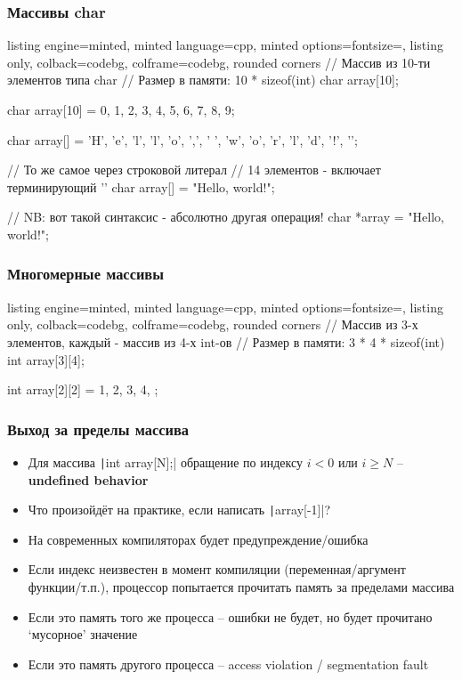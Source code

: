\documentclass[10pt]{beamer}
\begin{document}
\begin{frame}[fragile]
\frametitle{Массивы char}
\begin{tcblisting}{listing engine=minted, minted language=cpp, minted options={fontsize=\scriptsize}, listing only, colback=codebg, colframe=codebg, rounded corners}
// Массив из 10-ти элементов типа char
// Размер в памяти: 10 * sizeof(int)
char array[10];

char array[10] = {0, 1, 2, 3, 4, 5, 6, 7, 8, 9};

char array[] = {'H', 'e', 'l', 'l', 'o', ',',
  ' ', 'w', 'o', 'r', 'l', 'd', '!', '\0'};

// То же самое через строковой литерал
// 14 элементов - включает терминирующий '\0'
char array[] = "Hello, world!";

// NB: вот такой синтаксис - абсолютно другая операция!
char *array = "Hello, world!";
\end{tcblisting}
\end{frame}

\begin{frame}[fragile]
\frametitle{Многомерные массивы}
\begin{tcblisting}{listing engine=minted, minted language=cpp, minted options={fontsize=\scriptsize}, listing only, colback=codebg, colframe=codebg, rounded corners}
// Массив из 3-х элементов, каждый - массив из 4-х int-ов
// Размер в памяти: 3 * 4 * sizeof(int)
int array[3][4];

int array[2][2] = {
  {1, 2},
  {3, 4},
};
\end{tcblisting}
\end{frame}

\begin{frame}[fragile]
\frametitle{Выход за пределы массива}
\begin{itemize}
\item Для массива \texttt|int array[N];| обращение по индексу \(i<0\) или \(i\geq N\) -- \textbf{undefined behavior}
\pause
\item Что произойдёт на практике, если написать \texttt|array[-1]|?
\pause
\item На современных компиляторах будет предупреждение/ошибка
\pause
\item Если индекс неизвестен в момент компиляции (переменная/аргумент функции/т.п.), процессор попытается прочитать память за пределами массива
\pause
\item Если это память того же процесса -- ошибки не будет, но будет прочитано `мусорное' значение
\pause
\item Если это память другого процесса -- access violation / segmentation fault
\end{itemize}
\end{frame}
\end{document}
